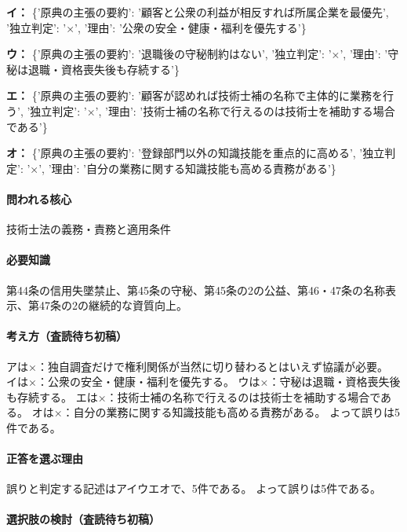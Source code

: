 \noindent\textbf{イ：} \{'原典の主張の要約': '顧客と公衆の利益が相反すれば所属企業を最優先', '独立判定': '×', '理由': '公衆の安全・健康・福利を優先する'\}\par

\noindent\textbf{ウ：} \{'原典の主張の要約': '退職後の守秘制約はない', '独立判定': '×', '理由': '守秘は退職・資格喪失後も存続する'\}\par

\noindent\textbf{エ：} \{'原典の主張の要約': '顧客が認めれば技術士補の名称で主体的に業務を行う', '独立判定': '×', '理由': '技術士補の名称で行えるのは技術士を補助する場合である'\}\par

\noindent\textbf{オ：} \{'原典の主張の要約': '登録部門以外の知識技能を重点的に高める', '独立判定': '×', '理由': '自分の業務に関する知識技能も高める責務がある'\}\par

\paragraph{問われる核心} 技術士法の義務・責務と適用条件

\paragraph{必要知識} 第44条の信用失墜禁止、第45条の守秘、第45条の2の公益、第46・47条の名称表示、第47条の2の継続的な資質向上。

\paragraph{考え方（査読待ち初稿）} アは×：独自調査だけで権利関係が当然に切り替わるとはいえず協議が必要。 イは×：公衆の安全・健康・福利を優先する。 ウは×：守秘は退職・資格喪失後も存続する。 エは×：技術士補の名称で行えるのは技術士を補助する場合である。 オは×：自分の業務に関する知識技能も高める責務がある。 よって誤りは5件である。

\paragraph{正答を選ぶ理由} 誤りと判定する記述はアイウエオで、5件である。  よって誤りは5件である。

\paragraph{選択肢の検討（査読待ち初稿）}\mbox{}\par

